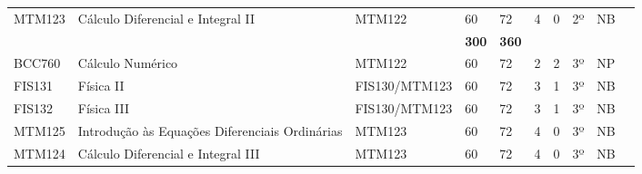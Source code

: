 \begin{table}[]
{\begin{tabular}{l|l|l|l|l|l|l|l|l|l}
			\multicolumn{1}{|l|}{MTM123}                        & Cálculo Diferencial e Integral II                        & MTM122                        & 60                                                           & 72                         & 4                        & 0                         & 2º                         & NB                      &  \\ \cline{1-9}
			\multicolumn{1}{|l|}{}                              &                                                          &                               & \textbf{300}                                                 & \textbf{360}               &                          &                           &                            &                         &  \\ \cline{1-9}
			\multicolumn{1}{|l|}{BCC760}                        & Cálculo Numérico                                         & MTM122                        & 60                                                           & 72                         & 2                        & 2                         & 3º                         & NP                      &  \\ \cline{1-9}
			\multicolumn{1}{|l|}{FIS131}                        & Física II                                                & FIS130/MTM123                 & 60                                                           & 72                         & 3                        & 1                         & 3º                         & NB                      &  \\ \cline{1-9}
			\multicolumn{1}{|l|}{FIS132}                        & Física III                                               & FIS130/MTM123                 & 60                                                           & 72                         & 3                        & 1                         & 3º                         & NB                      &  \\ \cline{1-9}
			\multicolumn{1}{|l|}{MTM125}                        & Introdução às Equações Diferenciais Ordinárias           & MTM123                        & 60                                                           & 72                         & 4                        & 0                         & 3º                         & NB                      &  \\ \cline{1-9}
			\multicolumn{1}{|l|}{MTM124}                        & Cálculo Diferencial e Integral III                       & MTM123                        & 60                                                           & 72                         & 4                        & 0                         & 3º                         & NB                      &  \\ \cline{1-9}

\end{tabular}}
\end{table}
